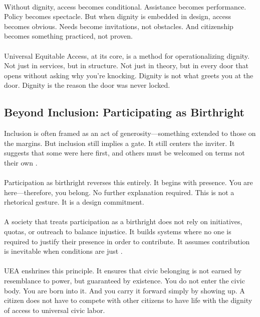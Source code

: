 \documentclass[12pt]{article}
\begin{document}
\paragraph{}Without dignity, access becomes conditional. Assistance becomes performance. Policy becomes spectacle. But when dignity is embedded in design, access becomes obvious. Needs become invitations, not obstacles. And citizenship becomes something practiced, not proven.

\paragraph{}Universal Equitable Access, at its core, is a method for operationalizing dignity. Not just in services, but in structure. Not just in theory, but in every door that opens without asking why you’re knocking. Dignity is not what greets you at the door. Dignity is the reason the door was never locked.

\subsection{Beyond Inclusion: Participating as Birthright}

Inclusion is often framed as an act of generosity—something extended to those on the margins. But inclusion still implies a gate. It still centers the inviter. It suggests that some were here first, and others must be welcomed on terms not their own \cite{young1990justice}.

\paragraph{}Participation as birthright reverses this entirely. It begins with presence. You are here—therefore, you belong. No further explanation required. This is not a rhetorical gesture. It is a design commitment.

\paragraph{}A society that treats participation as a birthright does not rely on initiatives, quotas, or outreach to balance injustice. It builds systems where no one is required to justify their presence in order to contribute. It assumes contribution is inevitable when conditions are just \cite{decmic2022reclaiming}.

\paragraph{}UEA enshrines this principle. It ensures that civic belonging is not earned by resemblance to power, but guaranteed by existence. You do not enter the civic body. You are born into it. And you carry it forward simply by showing up. A citizen does not have to compete with other citizens to have life with the dignity of access to universal civic labor.
\end{document}
